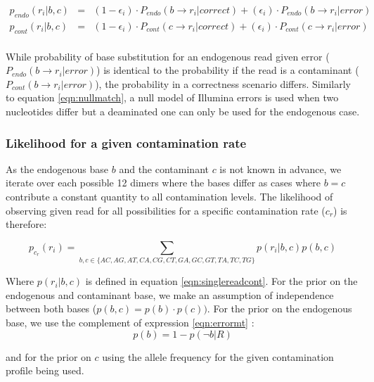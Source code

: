 \documentclass[a4paper,12pt]{article}
\begin{document}
{\begin{eqnarray}
  p_{endo}(r_i|b,c)   & = &  (1-\epsilon_i ) \cdot  P_{endo}( b \to r_i|correct) +  (\epsilon_i) \cdot P_{endo}(  b \to r_i |error)   \\
  p_{cont}(r_i|b,c)   & = &  (1-\epsilon_i ) \cdot  P_{cont}( c \to r_i|correct) +  (\epsilon_i) \cdot P_{cont}(  c \to r_i |error)   \\
\end{eqnarray} 

\noindent While probability of base substitution for an endogenous read given error ($P_{endo}(  b \to r_i |error)$) is identical to the probability if the read is a contaminant ($P_{cont}(  b \to r_i |error)$), the probability in a correctness scenario differs. Similarly to equation \ref{eqn:nullmatch}, a null model of Illumina errors is used when two nucleotides differ but a deaminated one can only be used for the endogenous case. 

\subsubsection{Likelihood for a given contamination rate}

As the endogenous base $b$ and the contaminant $c$ is not known in advance, we iterate over each possible 12 dimers where the bases differ as cases where $b=c$ contribute a constant quantity to all contamination levels. The likelihood of observing given read for all possibilities for a specific contamination rate ($c_r$) is therefore:

\begin{equation}
p_{c_r}(r_i) = \sum\limits_{ b,c \in \{AC,AG,AT,CA,CG,CT,GA,GC,GT,TA,TC,TG\} } p(r_i|b,c) p(b,c)
\end{equation}

\noindent Where $p(r_i|b,c)$ is defined in equation \ref{eqn:singlereadcont}. For the prior on the endogenous and contaminant base, we make an assumption of independence between both bases ($p(b,c) = p(b) \cdot p(c))$. For the prior on the endogenous base, we use the complement of expression \ref{eqn:errormt} :
\begin{equation}
p(b)  = 1 - p(\neg b|R)
\end{equation}

\noindent  and for the prior on $c$ using the allele frequency for the given contamination profile being used. 


}
\end{document}
